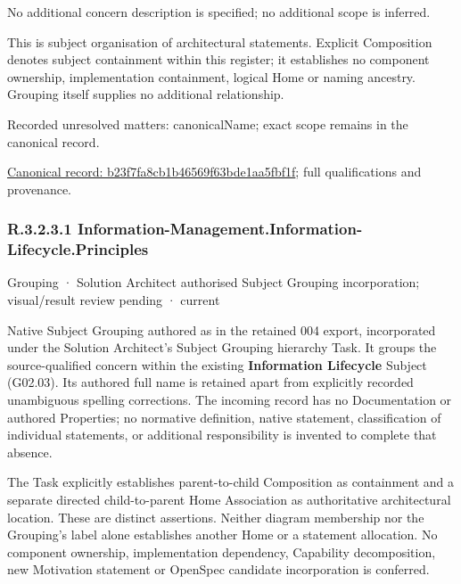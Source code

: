 No additional concern description is specified; no additional scope is inferred.



This is subject organisation of architectural statements. Explicit Composition denotes subject containment within this register; it establishes no component ownership, implementation containment, logical Home or naming ancestry. Grouping itself supplies no additional relationship.


{\small Recorded unresolved matters: canonicalName; exact scope remains in the canonical record.}\par
{\footnotesize \href{../../../../continuum/grouping/b23f7fa8cb1b46569f63bde1aa5fbf1f.md}{Canonical record: b23f7fa8cb1b46569f63bde1aa5fbf1f}; full qualifications and provenance.}\par
\subsubsection*{R.3.2.3.1 Information-Management.Information-Lifecycle.Principles}
\label{navigation:R.3.2.3.1}

\label{element:f14ca9b3213d4c3db3c5d479b4cc938e}
{\small Grouping · Solution Architect authorised Subject Grouping incorporation; visual/result review pending · current}\par

Native Subject Grouping authored as \texttt{} in the retained 004 export,
incorporated under the Solution Architect's Subject Grouping hierarchy Task.
It groups the source-qualified \texttt{} concern within
the existing \textbf{Information Lifecycle} Subject (G02.03). Its authored full name
is retained apart from explicitly recorded unambiguous spelling corrections.
The incoming record has no Documentation or authored Properties; no normative
definition, native statement, classification of individual statements, or
additional responsibility is invented to complete that absence.



The Task explicitly establishes parent-to-child Composition as containment and
a separate directed child-to-parent Home Association as authoritative architectural
location. These are distinct assertions. Neither diagram membership nor the
Grouping's label alone establishes another Home or a statement allocation.
No component ownership, implementation dependency, Capability decomposition,
new Motivation statement or OpenSpec candidate incorporation is conferred.



